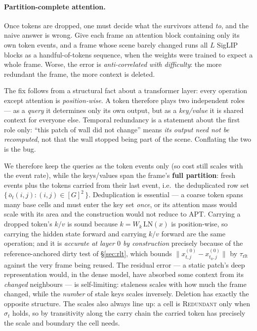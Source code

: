 \paragraph{Partition-complete attention.}
\label{sec:attention}
Once tokens are dropped, one must decide what the survivors attend \emph{to}, and
the naive answer is wrong. Give each frame an attention block containing only its
own token events, and a frame whose scene barely changed runs all $L$ SigLIP
blocks as a handful-of-tokens sequence, when the weights were trained to expect a
whole frame. Worse, the error is \emph{anti-correlated with difficulty}: the more
redundant the frame, the more context is deleted.

The fix follows from a structural fact about a transformer layer: every operation
except attention is \emph{position-wise}. A token therefore plays two independent
roles --- as a \emph{query} it determines only its own output, but as a
\emph{key/value} it is shared context for everyone else. Temporal redundancy is a
statement about the first role only: ``this patch of wall did not change'' means
\emph{its output need not be recomputed}, not that the wall stopped being part of
the scene. Conflating the two is the bug.

We therefore keep the queries as the token events only (so cost still scales with
the event rate), while the keys/values span the frame's \textbf{full partition}:
fresh events plus the tokens carried from their last event, i.e.\ the
deduplicated row set $\{\,\bar{o}_t(i,j) : (i,j) \in [G]^2\,\}$. Deduplication is
essential --- a coarse token spans many base cells and must enter the key set
\emph{once}, or its attention mass would scale with its area and the construction
would not reduce to APT. Carrying a dropped token's $k/v$ is sound because
$k = W_k\,\mathrm{LN}(x)$ is position-wise, so carrying the hidden state forward
and carrying $k/v$ forward are the same operation; and it is \emph{accurate at
layer $0$ by construction} precisely because of the reference-anchored dirty test
of \S\ref{sec:rlt}, which bounds $\|x^{(0)}_{t,j} - x^{(0)}_{t_0,j}\|$ by
$\tau_{\text{rlt}}$ against the very frame being reused. The residual error --- a
static patch's deep representation would, in the dense model, have absorbed some
context from its \emph{changed} neighbours --- is self-limiting: staleness scales
with how much the frame changed, while the \emph{number} of stale keys scales
inversely. Deletion has exactly the opposite structure. The scales also always
line up: a cell is \textsc{Redundant} only when $\sigma_t$ holds, so by
transitivity along the carry chain the carried token has precisely the scale and
boundary the cell needs.

